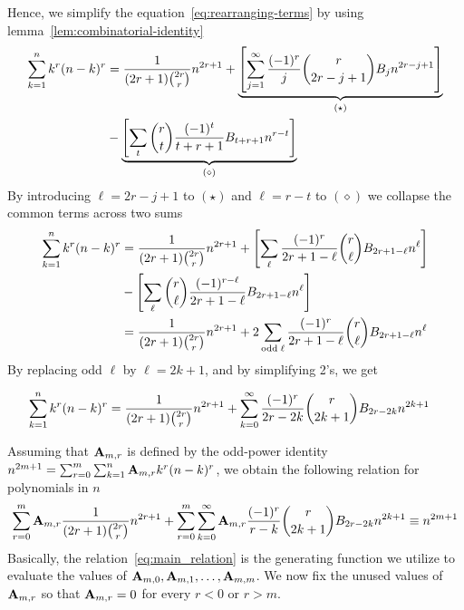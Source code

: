 Hence, we simplify the equation~\eqref{eq:rearranging-terms} by using lemma~\eqref{lem:combinatorial-identity}
\begin{equation*}
    \begin{split}
        \sum_{k=1}^{n} k^{r} (n-k)^{r}
        &= \frac{1}{(2r+1) \binom{2r}r} n^{2r+1}
        + \underbrace{\left[ \sum_{j = 1}^{\infty} \frac{(-1)^r}{j} \binom{r}{2r-j+1} {B}\sb{j} n^{2r-j+1} \right]}_{(\star)} \\
        &- \underbrace{\left[ \sum_{t} \binom{r}{t} \frac{(-1)^t}{t+r+1} {B}\sb{t+r+1} n^{r-t} \right]}_{(\diamond)}
    \end{split}
\end{equation*}
By introducing $\ell=2r-j+1$ to $(\star)$ and $\ell=r-t$ to $(\diamond)$
we collapse the common terms across two sums
\begin{align*}
    \sum_{k=1}^{n} k^{r} (n-k)^{r}
    &= \frac{1}{(2r+1) \binom{2r}r} n^{2r+1}
    + \left[ \sum_{\ell} \frac{(-1)^r}{2r+1-\ell} \binom{r}{\ell} {B}\sb{2r+1-\ell} n^{\ell} \right] \\
    &- \left[ \sum_{\ell} \binom{r}{\ell} \frac{(-1)^{r-\ell}}{2r+1-\ell} {B}\sb{2r+1-\ell} n^{\ell} \right]\\
    &= \frac{1}{(2r+1) \binom{2r}r} n^{2r+1} + 2 \sum_{\mathrm{odd \; \ell}} \frac{(-1)^r}{2r+1-\ell} \binom{r}{\ell} {B}\sb{2r+1-\ell} n^{\ell}
\end{align*}
By replacing odd $\ell$ by $\ell = 2k+1$, and by simplifying 2's, we get
\begin{proposition}
    \label{prop:bivariate-faulhabers-formula}
    \begin{align*}
        \sum_{k=1}^{n} k^{r} (n-k)^{r} &= \frac{1}{(2r+1) \binom{2r}r} n^{2r+1} + \sum_{k=0}^{\infty} \frac{(-1)^r}{2r-2k} \binom{r}{2k+1} {B}\sb{2r-2k} n^{2k+1}
    \end{align*}
\end{proposition}

Assuming that ${\mathbf{A}} \sb{m,r}$ is defined
by the odd-power identity $n^{2m+1} = \sum_{r=0}^{m} \sum_{k=1}^{n} {\mathbf{A}} \sb{m,r} k^r (n-k)^r$,
we obtain the following relation for polynomials in $n$
\begin{align}
    \label{eq:main_relation}
    \sum_{r=0}^{m} {\mathbf{A}} \sb{m,r} \frac{1}{(2r+1) \binom{2r}{r}} n^{2r+1} + \sum_{r=0}^{m} \sum_{k=0}^{\infty} {\mathbf{A}} \sb{m,r} \frac{(-1)^r}{r-k} \binom{r}{2k+1} {B}\sb{2r-2k} n^{2k+1}  \equiv n^{2m+1}
\end{align}
Basically, the relation~\eqref{eq:main_relation} is the generating function we utilize to
evaluate the values of ${\mathbf{A}} \sb{m,0}, {\mathbf{A}} \sb{m,1}, \ldots, {\mathbf{A}} \sb{m,m}$.
We now fix the unused values of ${\mathbf{A}} \sb{m,r}$ so that ${\mathbf{A}} \sb{m,r} = 0$ for every $r < 0$ or $r > m$.

